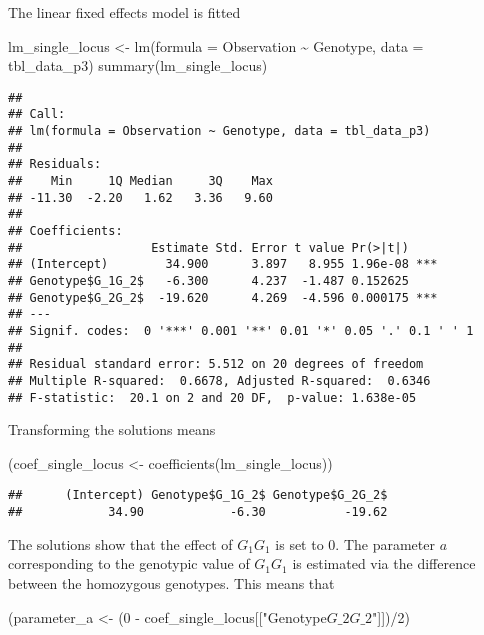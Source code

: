\documentclass[
]{article}
\newenvironment{Shaded}{\begin{snugshade}}{\end{snugshade}}
\newcommand{\AttributeTok}[1]{\textcolor[rgb]{0.77,0.63,0.00}{#1}}
\newcommand{\DecValTok}[1]{\textcolor[rgb]{0.00,0.00,0.81}{#1}}
\newcommand{\FunctionTok}[1]{\textcolor[rgb]{0.00,0.00,0.00}{#1}}
\newcommand{\NormalTok}[1]{#1}
\newcommand{\OtherTok}[1]{\textcolor[rgb]{0.56,0.35,0.01}{#1}}
\newcommand{\SpecialCharTok}[1]{\textcolor[rgb]{0.00,0.00,0.00}{#1}}
\newcommand{\StringTok}[1]{\textcolor[rgb]{0.31,0.60,0.02}{#1}}
\begin{document}
The linear fixed effects model is fitted

\begin{Shaded}
\begin{Highlighting}[]
\NormalTok{lm\_single\_locus }\OtherTok{\textless{}{-}} \FunctionTok{lm}\NormalTok{(}\AttributeTok{formula =}\NormalTok{ Observation }\SpecialCharTok{\textasciitilde{}}\NormalTok{ Genotype, }\AttributeTok{data =}\NormalTok{ tbl\_data\_p3)}
\FunctionTok{summary}\NormalTok{(lm\_single\_locus)}
\end{Highlighting}
\end{Shaded}

\begin{verbatim}
## 
## Call:
## lm(formula = Observation ~ Genotype, data = tbl_data_p3)
## 
## Residuals:
##    Min     1Q Median     3Q    Max 
## -11.30  -2.20   1.62   3.36   9.60 
## 
## Coefficients:
##                  Estimate Std. Error t value Pr(>|t|)    
## (Intercept)        34.900      3.897   8.955 1.96e-08 ***
## Genotype$G_1G_2$   -6.300      4.237  -1.487 0.152625    
## Genotype$G_2G_2$  -19.620      4.269  -4.596 0.000175 ***
## ---
## Signif. codes:  0 '***' 0.001 '**' 0.01 '*' 0.05 '.' 0.1 ' ' 1
## 
## Residual standard error: 5.512 on 20 degrees of freedom
## Multiple R-squared:  0.6678, Adjusted R-squared:  0.6346 
## F-statistic:  20.1 on 2 and 20 DF,  p-value: 1.638e-05
\end{verbatim}

Transforming the solutions means

\begin{Shaded}
\begin{Highlighting}[]
\NormalTok{(coef\_single\_locus }\OtherTok{\textless{}{-}} \FunctionTok{coefficients}\NormalTok{(lm\_single\_locus))}
\end{Highlighting}
\end{Shaded}

\begin{verbatim}
##      (Intercept) Genotype$G_1G_2$ Genotype$G_2G_2$ 
##            34.90            -6.30           -19.62
\end{verbatim}

The solutions show that the effect of \(G_1G_1\) is set to \(0\). The
parameter \(a\) corresponding to the genotypic value of \(G_1G_1\) is
estimated via the difference between the homozygous genotypes. This
means that

\begin{Shaded}
\begin{Highlighting}[]
\NormalTok{(parameter\_a }\OtherTok{\textless{}{-}}\NormalTok{ (}\DecValTok{0} \SpecialCharTok{{-}}\NormalTok{ coef\_single\_locus[[}\StringTok{"Genotype$G\_2G\_2$"}\NormalTok{]])}\SpecialCharTok{/}\DecValTok{2}\NormalTok{)}
\end{Highlighting}
\end{Shaded}
\end{document}

